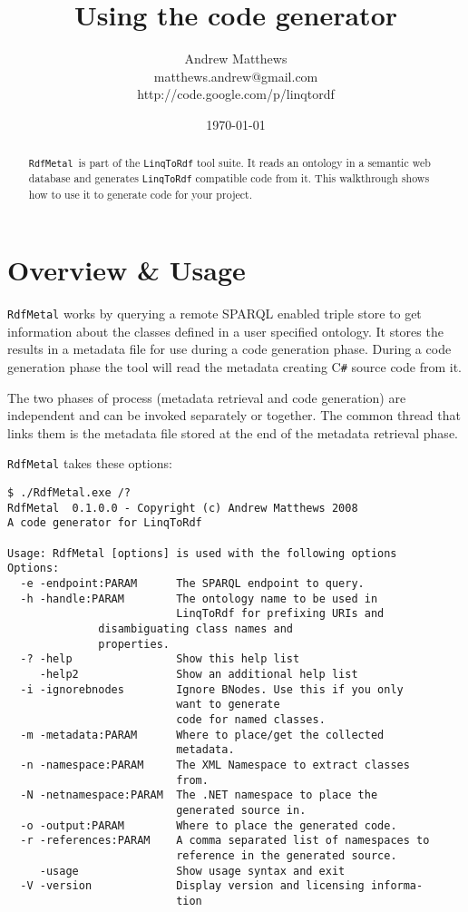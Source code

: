 \documentclass{article}
\author{Andrew Matthews\\
  matthews.andrew@gmail.com\\
  http://code.google.com/p/linqtordf}
\title{Using the \rm{} code generator}
\date{\today}
\newcommand{\cs}{C\texttt{\#}}
\def\spq{SPARQL}
\def\rm{\texttt{RdfMetal}}
\def\l2r{\texttt{LinqToRdf}}
\begin{document}
\maketitle

\begin{abstract}
\rm\ is part of the \l2r{} tool suite. It reads an ontology in a semantic
web database and generates \l2r{} compatible code from it. This walkthrough
shows how to use it to generate code for your project.
\end{abstract}

\section{Overview \& Usage} 

\rm{} works by querying a remote \spq{} enabled triple store to get information
about the classes defined in a user specified ontology. It stores the results in
a metadata file for use during a code generation phase. During a code generation
phase the tool will read the metadata creating \cs{} source code from it.

The two phases of process (metadata retrieval and code generation) are
independent and can be invoked separately or together. The common thread that links
them is the metadata file stored at the end of the metadata retrieval phase.

\rm{} takes these options:

\begin{verbatim}
$ ./RdfMetal.exe /?
RdfMetal  0.1.0.0 - Copyright (c) Andrew Matthews 2008
A code generator for LinqToRdf

Usage: RdfMetal [options] is used with the following options
Options:
  -e -endpoint:PARAM      The SPARQL endpoint to query.
  -h -handle:PARAM        The ontology name to be used in 
                          LinqToRdf for prefixing URIs and 
			  disambiguating class names and 
			  properties.
  -? -help                Show this help list
     -help2               Show an additional help list
  -i -ignorebnodes        Ignore BNodes. Use this if you only 
                          want to generate 
                          code for named classes.
  -m -metadata:PARAM      Where to place/get the collected 
                          metadata.
  -n -namespace:PARAM     The XML Namespace to extract classes 
                          from.
  -N -netnamespace:PARAM  The .NET namespace to place the 
                          generated source in.
  -o -output:PARAM        Where to place the generated code.
  -r -references:PARAM    A comma separated list of namespaces to 
                          reference in the generated source.
     -usage               Show usage syntax and exit
  -V -version             Display version and licensing informa-
                          tion
\end{verbatim}
\end{document}
